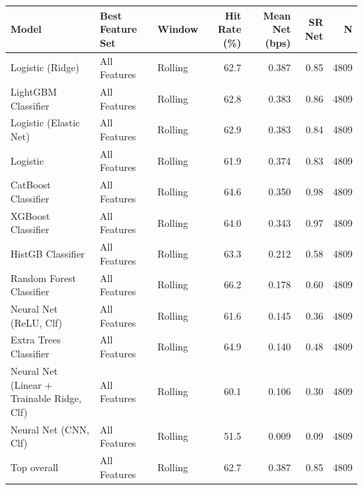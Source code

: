 \begin{tabular}{lllrrrr}
\toprule
Model & Best Feature Set & Window & Hit Rate (\%) & Mean Net (bps) & SR Net & N \\
\midrule
Logistic (Ridge) & All Features & Rolling & 62.7 & 0.387 & 0.85 & 4809 \\
LightGBM Classifier & All Features & Rolling & 62.8 & 0.383 & 0.86 & 4809 \\
Logistic (Elastic Net) & All Features & Rolling & 62.9 & 0.383 & 0.84 & 4809 \\
Logistic & All Features & Rolling & 61.9 & 0.374 & 0.83 & 4809 \\
CatBoost Classifier & All Features & Rolling & 64.6 & 0.350 & 0.98 & 4809 \\
XGBoost Classifier & All Features & Rolling & 64.0 & 0.343 & 0.97 & 4809 \\
HistGB Classifier & All Features & Rolling & 63.3 & 0.212 & 0.58 & 4809 \\
Random Forest Classifier & All Features & Rolling & 66.2 & 0.178 & 0.60 & 4809 \\
Neural Net (ReLU, Clf) & All Features & Rolling & 61.6 & 0.145 & 0.36 & 4809 \\
Extra Trees Classifier & All Features & Rolling & 64.9 & 0.140 & 0.48 & 4809 \\
Neural Net (Linear + Trainable Ridge, Clf) & All Features & Rolling & 60.1 & 0.106 & 0.30 & 4809 \\
Neural Net (CNN, Clf) & All Features & Rolling & 51.5 & 0.009 & 0.09 & 4809 \\
\midrule
Top overall & All Features & Rolling & 62.7 & 0.387 & 0.85 & 4809 \\
\bottomrule
\end{tabular}
